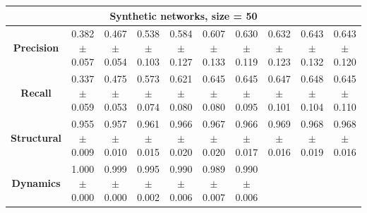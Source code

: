 \begin{table}[h!]
\begin{tabular}{|c|c|c|c|c|c|c|c|c|c|}
\hline
\multicolumn{10}{|c|}{\textbf{Synthetic networks, size = 50}} \\
\hline
\textbf{Precision} & 
\makecell{0.382 \\ $\pm$0.057} & \makecell{0.467 \\ $\pm$0.054} & \makecell{0.538 \\ $\pm$0.103} & 
\makecell{0.584 \\ $\pm$0.127} & \makecell{0.607 \\ $\pm$0.133} & \makecell{0.630 \\ $\pm$0.119} & 
\makecell{0.632 \\ $\pm$0.123} & \makecell{0.643 \\ $\pm$0.132} & \makecell{0.643 \\ $\pm$0.120} \\
\textbf{Recall} & 
\makecell{0.337 \\ $\pm$0.059} & \makecell{0.475 \\ $\pm$0.053} & \makecell{0.573 \\ $\pm$0.074} & 
\makecell{0.621 \\ $\pm$0.080} & \makecell{0.645 \\ $\pm$0.080} & \makecell{0.645 \\ $\pm$0.095} & 
\makecell{0.647 \\ $\pm$0.101} & \makecell{0.648 \\ $\pm$0.104} & \makecell{0.645 \\ $\pm$0.110} \\
\textbf{Structural} & 
\makecell{0.955 \\ $\pm$0.009} & \makecell{0.957 \\ $\pm$0.010} & \makecell{0.961 \\ $\pm$0.015} & 
\makecell{0.966 \\ $\pm$0.020} & \makecell{0.967 \\ $\pm$0.020} & \makecell{0.966 \\ $\pm$0.017} & 
\makecell{0.969 \\ $\pm$0.016} & \makecell{0.968 \\ $\pm$0.019} & \makecell{0.968 \\ $\pm$0.016} \\
\textbf{Dynamics} & 
\makecell{1.000 \\ $\pm$0.000} & \makecell{0.999 \\ $\pm$0.000} & \makecell{0.995 \\ $\pm$0.002} & 
\makecell{0.990 \\ $\pm$0.006} & \makecell{0.989 \\ $\pm$0.007} & \makecell{0.990 \\ $\pm$0.006} & 

\end{tabular}
\end{table}
